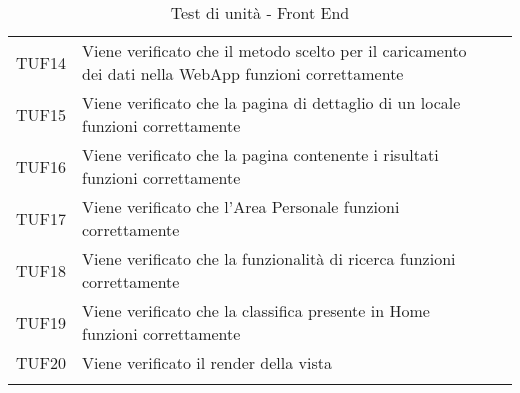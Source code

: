 \begin{longtable}{ m{}<{\centering}  m{}<{\centering}  m{}<{\centering} }
	TUF14 & Viene verificato che il metodo scelto per il caricamento dei dati nella WebApp funzioni correttamente & \Ni \\
	TUF15 & Viene verificato che la pagina di dettaglio di un locale funzioni correttamente & \Ni \\
	TUF16 & Viene verificato che la pagina contenente i risultati funzioni correttamente & \Ni \\
	TUF17 & Viene verificato che l'Area Personale funzioni correttamente & \Ni \\
	TUF18 & Viene verificato che la funzionalità di ricerca funzioni correttamente & \Ni \\
	TUF19 & Viene verificato che la classifica presente in Home funzioni correttamente & \Ni \\
	TUF20 & Viene verificato il render della vista & \Ni \\

    \caption{Test di unità - Front End}
\end{longtable}	

%
%	 
%	
%
